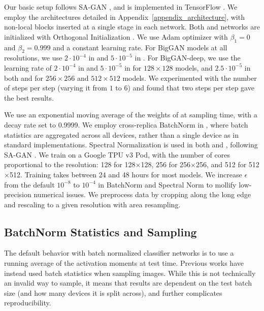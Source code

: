 Our basic setup follows SA-GAN \citep{zhang2018sagan}, and is implemented in TensorFlow \citep{Abadi2016tf}. We employ the architectures detailed in Appendix~\ref{appendix_architecture}, with non-local blocks inserted at a single stage in each network. Both \gen{} and \discr{} networks are initialized with Orthogonal Initialization \citep{saxe2014ortho}.  
We use Adam optimizer \citep{kingma2014adam} with $\beta_1=0$ and $\beta_2=0.999$ and a constant learning rate. 
For BigGAN models at all resolutions, we use $2\cdot10^{-4}$ in \discr{} and $5\cdot10^{-5}$ in \gen{}.
For BigGAN-deep, we use the learning rate of $2\cdot10^{-4}$ in \discr{} and $5\cdot10^{-5}$ in \gen{} for $128\times 128$ models, and $2.5\cdot10^{-5}$ in both \discr{} and \gen{} for $256\times 256$ and $512\times 512$ models.
We experimented with the number of \discr{} steps per \gen{} step (varying it from $1$ to $6$) and found that two \discr{} steps per \gen{} step gave the best results. 

We use an exponential moving average of the weights of \gen{} at sampling time, with a decay rate set to 0.9999. We employ cross-replica BatchNorm \citep{ioffe2015batchnorm} in \gen{}, where batch statistics are aggregated across all devices, rather than a single device as in standard implementations. Spectral Normalization \citep{miyato2018spectral} is used in both \gen{} and \discr{}, following SA-GAN \citep{zhang2018sagan}. We train on a Google TPU v3
Pod, with the number of cores proportional to the resolution: 128 for 128$\times$128, 256 for 256$\times$256, and 512 for 512$\times$512. Training takes between 24 and 48 hours for most models. We increase $\epsilon$ from the default $10^{-8}$ to $10^{-4}$ in BatchNorm and Spectral Norm to mollify low-precision numerical issues.
We preprocess data by cropping along the long edge and rescaling to a given resolution with area resampling. 

\subsection{BatchNorm Statistics and Sampling}
The default behavior with batch normalized classifier networks is to use a running average of the activation moments at test time. Previous works \citep{radford2016dcgan} have instead used batch statistics when sampling images. While this is not technically an invalid way to sample, it means that results are dependent on the test batch size (and how many devices it is split across), and further complicates reproducibility.

